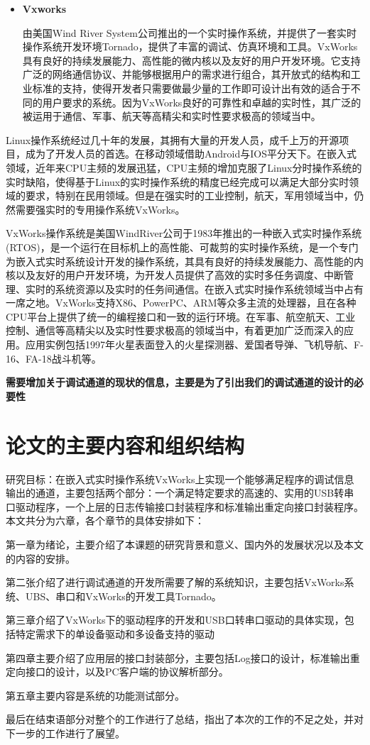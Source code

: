 \begin{itemize}
\item \textbf{Vxworks}

	由美国Wind River System公司推出的一个实时操作系统，并提供了一套实时操作系统开发环境Tornado，提供了丰富的调试、仿真环境和工具。VxWorks具有良好的持续发展能力、高性能的微内核以及友好的用户开发环境。它支持广泛的网络通信协议、并能够根据用户的需求进行组合，其开放式的结构和工业标准的支持，使得开发者只需要做最少量的工作即可设计出有效的适合于不同的用户要求的系统。因为VxWorks良好的可靠性和卓越的实时性，其广泛的被运用于通信、军事、航天等高精尖和实时性要求极高的领域当中。	
	 
\end{itemize}

	Linux操作系统经过几十年的发展，其拥有大量的开发人员，成千上万的开源项目，成为了开发人员的首选。在移动领域借助Android与IOS平分天下。在嵌入式领域，近年来CPU主频的发展迅猛，CPU主频的增加克服了Linux分时操作系统的实时缺陷，使得基于Linux的实时操作系统的精度已经完成可以满足大部分实时领域的要求，特别在民用领域。但是在强实时的工业控制，航天，军用领域当中，仍然需要强实时的专用操作系统VxWorks。 	
	
	VxWorks操作系统是美国WindRiver公司于1983年推出的一种嵌入式实时操作系统(RTOS)，是一个运行在目标机上的高性能、可裁剪的实时操作系统，是一个专门为嵌入式实时系统设计开发的操作系统，其具有良好的持续发展能力、高性能的内核以及友好的用户开发环境，为开发人员提供了高效的实时多任务调度、中断管理、实时的系统资源以及实时的任务间通信。在嵌入式实时操作系统领域当中占有一席之地。VxWorks支持X86、PowerPC、ARM等众多主流的处理器，且在各种CPU平台上提供了统一的编程接口和一致的运行环境。在军事、航空航天、工业控制、通信等高精尖以及实时性要求极高的领域当中，有着更加广泛而深入的应用。应用实例包括1997年火星表面登入的火星探测器、爱国者导弹、飞机导航、F-16、FA-18战斗机等。
	
\textbf{需要增加关于调试通道的现状的信息，主要是为了引出我们的调试通道的设计的必要性}
	


\section{论文的主要内容和组织结构}	
	研究目标：在嵌入式实时操作系统VxWorks上实现一个能够满足程序的调试信息输出的通道，主要包括两个部分：一个满足特定要求的高速的、实用的USB转串口驱动程序，一个上层的日志传输接口封装程序和标准输出重定向接口封装程序。\\
 本文共分为六章，各个章节的具体安排如下：
 
 第一章为绪论，主要介绍了本课题的研究背景和意义、国内外的发展状况以及本文的内容的安排。
 
 第二张介绍了进行调试通道的开发所需要了解的系统知识，主要包括VxWorks系统、UBS、串口和VxWorks的开发工具Tornado。
 
 第三章介绍了VxWorks下的驱动程序的开发和USB口转串口驱动的具体实现，包括特定需求下的单设备驱动和多设备支持的驱动
 
 第四章主要介绍了应用层的接口封装部分，主要包括Log接口的设计，标准输出重定向接口的设计，以及PC客户端的协议解析部分。
 
 第五章主要内容是系统的功能测试部分。
 
 最后在结束语部分对整个的工作进行了总结，指出了本次的工作的不足之处，并对下一步的工作进行了展望。 

